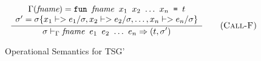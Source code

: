 \documentclass[10pt]{../sigplanconf}
\newcommand{\nfrac}[2]{\frac{\displaystyle{#1}}{\displaystyle{#2}}}
\newcommand{\tagsc}[1]{\tag{\scshape #1}}
\begin{document}
\begin{figure}
\begin{equation}
  \nfrac{
    \begin{array}{c}
      \Gamma(\textit{fname}) =
        \texttt{fun \textit{\rmfamily fname} $x_1$ $x_2$ $\ldots$ $x_n$ = $t$}
        \\
      \sigma' = \sigma\{x_1 |-> e_1/\sigma, x_2 |-> e_2/\sigma, \ldots, x_n |-> e_n/\sigma\} 
    \end{array}
  }{
    \sigma |-_\Gamma \texttt{\textit{\rmfamily fname} $e_1$ $e_2$ $\ldots$ $e_n$} => (t, \sigma')
  } \tagsc{Call-F}
\end{equation}


\caption{Operational Semantics for TSG'}
\label{fig:semantics}
\end{figure}
\end{document}
